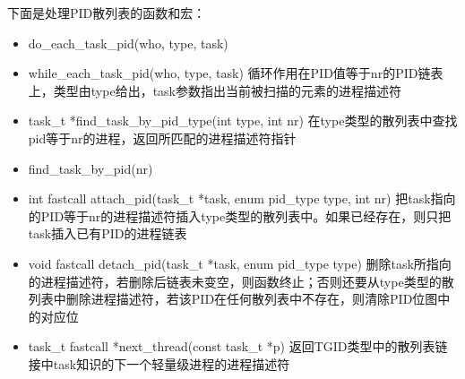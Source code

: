     下面是处理PID散列表的函数和宏：

\begin{itemize}
    \item do\_each\_task\_pid(who, type, task)
    \item while\_each\_task\_pid(who, type, task)
    \subitem 循环作用在PID值等于nr的PID链表上，类型由type给出，task参数指出当前被扫描的元素的进程描述符
    \item task\_t *find\_task\_by\_pid\_type(int type, int nr)
    \subitem 在type类型的散列表中查找pid等于nr的进程，返回所匹配的进程描述符指针
    \item find\_task\_by\_pid(nr)
    \item int fastcall attach\_pid(task\_t *task, enum pid\_type type, int nr)
    \subitem 把task指向的PID等于nr的进程描述符插入type类型的散列表中。如果已经存在，则只把task插入已有PID的进程链表
    \item void fastcall detach\_pid(task\_t *task, enum pid\_type type)
    \subitem 删除task所指向的进程描述符，若删除后链表未变空，则函数终止；否则还要从type类型的散列表中删除进程描述符，若该PID在任何散列表中不存在，则清除PID位图中的对应位
    \item task\_t fastcall *next\_thread(const task\_t *p)
    \subitem 返回TGID类型中的散列表链接中task知识的下一个轻量级进程的进程描述符
\end{itemize}